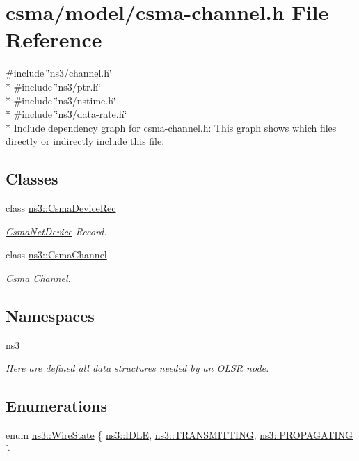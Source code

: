 \hypertarget{csma-channel_8h}{}\section{csma/model/csma-\/channel.h File Reference}
\label{csma-channel_8h}
{\ttfamily \#include \char`\"{}ns3/channel.\+h\char`\"{}}\\*
{\ttfamily \#include \char`\"{}ns3/ptr.\+h\char`\"{}}\\*
{\ttfamily \#include \char`\"{}ns3/nstime.\+h\char`\"{}}\\*
{\ttfamily \#include \char`\"{}ns3/data-\/rate.\+h\char`\"{}}\\*
Include dependency graph for csma-\/channel.h\+:
This graph shows which files directly or indirectly include this file\+:
\subsection*{Classes}
\begin{DoxyCompactItemize}
\item 
class \hyperlink{classns3_1_1CsmaDeviceRec}{ns3\+::\+Csma\+Device\+Rec}
\begin{DoxyCompactList}\small\item\em \hyperlink{classns3_1_1CsmaNetDevice}{Csma\+Net\+Device} Record. \end{DoxyCompactList}\item 
class \hyperlink{classns3_1_1CsmaChannel}{ns3\+::\+Csma\+Channel}
\begin{DoxyCompactList}\small\item\em Csma \hyperlink{classns3_1_1Channel}{Channel}. \end{DoxyCompactList}\end{DoxyCompactItemize}
\subsection*{Namespaces}
\begin{DoxyCompactItemize}
\item 
 \hyperlink{namespacens3}{ns3}
\begin{DoxyCompactList}\small\item\em Here are defined all data structures needed by an O\+L\+SR node. \end{DoxyCompactList}\end{DoxyCompactItemize}
\subsection*{Enumerations}
\begin{DoxyCompactItemize}
\item 
enum \hyperlink{namespacens3_aff37503a9e9f2dbe82b374050a73e105}{ns3\+::\+Wire\+State} \{ \hyperlink{namespacens3_aff37503a9e9f2dbe82b374050a73e105acb448301f46bfb634e8e803a6fd21264}{ns3\+::\+I\+D\+LE}, 
\hyperlink{namespacens3_aff37503a9e9f2dbe82b374050a73e105a5c6ba0512d778b658dc105cc604de3b3}{ns3\+::\+T\+R\+A\+N\+S\+M\+I\+T\+T\+I\+NG}, 
\hyperlink{namespacens3_aff37503a9e9f2dbe82b374050a73e105ac733aeba726ca997bf6790fa0e28fede}{ns3\+::\+P\+R\+O\+P\+A\+G\+A\+T\+I\+NG}
 \}
\end{DoxyCompactItemize}
